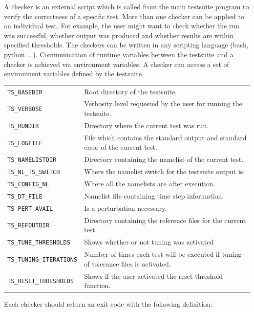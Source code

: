 \documentclass[12pt,twoside,a4paper]{report}
\begin{document}
A checker is an external script which is called from the main testsuite program to verify the correctness of a specific test. More than one checker can be applied to an individual test. For example, the user might want to check whether the run was successful, whether output was produced and whether results are within specified thresholds. The checkers can be written in any scripting language (bash, python ...). Communication of runtime variables between the testsuite and a checker is achieved via environment variables. A checker can access a set of environment variables defined by the testsuite.\\


\begin{tabular}{lp{10cm}}
\texttt{TS\_BASEDIR} & Root directory of the testsuite.\\[1.2ex]
\texttt{TS\_VERBOSE} & Verbosity level requested by the user for running the testsuite.\\[1.2ex]
\texttt{TS\_RUNDIR} & Directory where the current test was run.\\[1.2ex]
\texttt{TS\_LOGFILE} & File which contains the standard output and standard error of the current test.\\[1.2ex]
\texttt{TS\_NAMELISTDIR} & Directory containing the namelist of the current test.\\[1.2ex]
\texttt{TS\_NL\_TS\_SWITCH} & Where the namelist switch for the testsuite output is.\\[1.2ex]
\texttt{TS\_CONFIG\_NL} & Where all the namelists are after execution.\\[1.2ex]
\texttt{TS\_DT\_FILE} & Namelist file containing time step information.\\[1.2ex]
\texttt{TS\_PERT\_AVAIL} & Is a perturbation necessary.\\[1.2ex]
\texttt{TS\_REFOUTDIR} & Directory containing the reference files for the current test.\\[1.2ex]
\texttt{TS\_TUNE\_THRESHOLDS} & Shows whether or not tuning was activated\\[1.2ex]
\texttt{TS\_TUNING\_ITERATIONS} & Number of times each test will be executed if tuning of tolerance files is activated.\\[1.2ex]
\texttt{TS\_RESET\_THRESHOLDS} & Shows if the user activated the reset threshold function.\\[1.2ex]
\end{tabular}

Each checker should return an exit code with the following definition:\\
\end{document}

